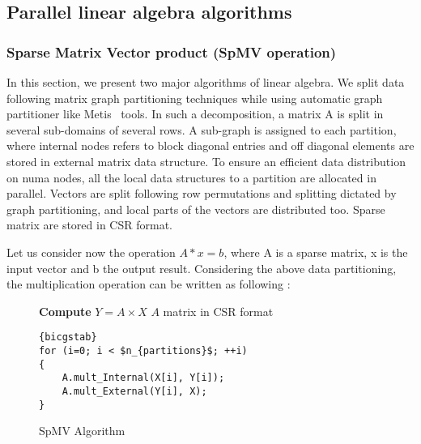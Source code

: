 \documentclass{Styles/llncs}
\begin{document}
\subsection{Parallel linear algebra algorithms}

\subsubsection{Sparse Matrix Vector product (SpMV operation)}

In this section, we present two major algorithms of linear algebra. We split data following matrix graph partitioning techniques \cite{Saad:2003:IMS:829576} while using automatic graph partitioner like Metis~\cite{metis} tools. In such a decomposition, a matrix A is split in several sub-domains of several rows. A sub-graph is assigned to each partition, where internal nodes refers to block diagonal entries and off diagonal elements are stored in external matrix data structure. To ensure an efficient data distribution on numa nodes, all the local data structures to a partition are allocated in parallel. Vectors are split following row permutations and splitting dictated by graph partitioning, and local parts of the vectors are distributed too. Sparse matrix are stored in CSR format.

Let us consider now the operation $A * x = b$, where A is a sparse matrix, x is the input vector and b the output result. Considering the above data partitioning, the multiplication operation can be written as following :

\begin{figure}[tc]
\begin{center}
\begin{minipage}[c]{0.6\linewidth}
\small{
\textbf{Compute} $Y =  A\times X$
$A$ matrix in CSR format\\
}
\begin{lstlisting}[frame=none,style=smaller,showlines=true,mathescape=true,firstnumber=1]{bicgstab}
for (i=0; i < $n_{partitions}$; ++i)
{
	A.mult_Internal(X[i], Y[i]); 
	A.mult_External(Y[i], X);
}
\end{lstlisting}
\end{minipage}\hfill
\end{center}
\caption{SpMV Algorithm} \label{lst:spmv}
\end{figure}
\end{document}
